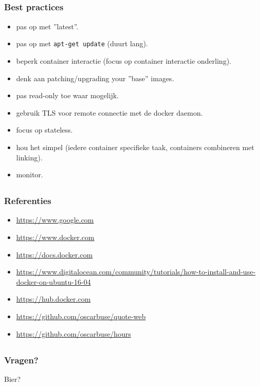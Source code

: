 \subsection{}
\begin{styleframefrag}
    \frametitle{Best practices}
\begin{itemize}
	\item pas op met ''latest''.
	\pause
	\item pas op met \verb!apt-get update! (duurt lang).
	\pause
	\item beperk container interactie (focus op container interactie onderling).
	\pause
	\item denk aan patching/upgrading your ''base'' images.
	\pause
	\item pas read-only toe waar mogelijk.
	\pause
	\item gebruik TLS voor remote connectie met de docker daemon.
	\pause
	\item focus op stateless.
	\pause
	\item hou het simpel (iedere container specifieke taak, containers combineren met linking).
	\pause
	\item monitor.
\end{itemize}
\end{styleframefrag}

\subsection{}
\begin{styleframe}
    \frametitle{Referenties}
\begin{itemize}
	\item \url{https://www.google.com}
	\item \url{https://www.docker.com}
	\item \url{https://docs.docker.com}
	\item \url{https://www.digitalocean.com/community/tutorials/how-to-install-and-use-docker-on-ubuntu-16-04}
	\item \url{https://hub.docker.com}
	\item \url{https://github.com/oscarbuse/quote-web}
	\item \url{https://github.com/oscarbuse/hours}
\end{itemize}
\end{styleframe}

\subsection{}
\begin{styleframe}
    \frametitle{Vragen?}
\begin{center}
\hspace{-20pt} \Huge Bier?
\end{center}
\end{styleframe}

